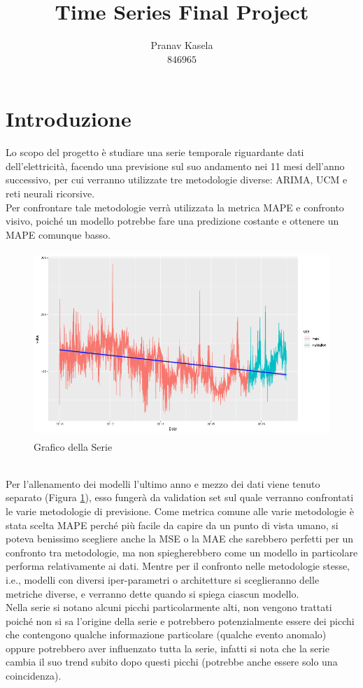 \documentclass[12pt, onecolumn]{article}
\title{Time Series Final Project}
\author{Pranav Kasela \\$846965$}
\date{}
\begin{document}
\maketitle

\section*{Introduzione}
Lo scopo del progetto è studiare una serie temporale riguardante dati dell'elettricità, facendo una previsione sul suo andamento nei 11 mesi dell'anno successivo, per cui verranno utilizzate tre metodologie diverse: ARIMA, UCM e reti neurali ricorsive.\\
Per confrontare tale metodologie verrà utilizzata la metrica MAPE e confronto visivo, poiché un modello potrebbe fare una predizione costante e ottenere un MAPE comunque basso.
\begin{figure}[!h]
  \centering
  \includegraphics[width=\linewidth, height=7cm]{imgs/Series.png}
  \caption{Grafico della Serie}
  \label{fig:series}
\end{figure}\\
Per l'allenamento dei modelli l'ultimo anno e mezzo dei dati viene tenuto separato (Figura \ref{fig:series}), esso fungerà da validation set sul quale verranno confrontati le varie metodologie di previsione.
Come metrica comune alle varie metodologie è stata scelta MAPE perché più facile da capire da un punto di vista umano, si poteva benissimo scegliere anche la MSE o la MAE che sarebbero perfetti per un confronto tra metodologie, ma non spiegherebbero come un modello in particolare performa relativamente ai dati.
Mentre per il confronto nelle metodologie stesse, i.e., modelli con diversi iper-parametri o architetture si sceglieranno delle metriche diverse, e verranno dette quando si spiega ciascun modello.\\
Nella serie si notano alcuni picchi particolarmente alti, non vengono trattati poiché non si sa l'origine della serie e potrebbero potenzialmente essere dei picchi che contengono qualche informazione particolare (qualche evento anomalo) oppure potrebbero aver influenzato tutta la serie, infatti si nota che la serie cambia il suo trend subito dopo questi picchi (potrebbe anche essere solo una coincidenza).
\end{document}

